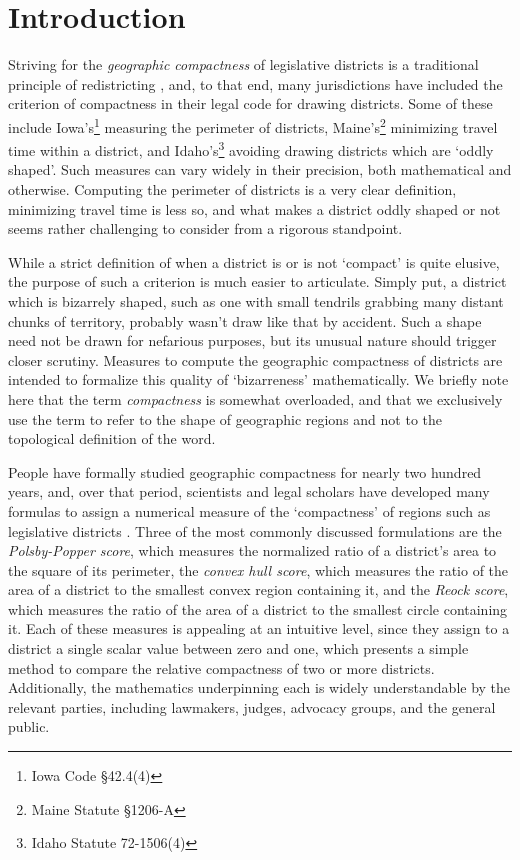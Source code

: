 \section{Introduction}
Striving for the \textit{geographic compactness} of legislative
districts is a traditional principle of redistricting \cite{altman_1998}, and, to that
end, many jurisdictions have included the criterion of compactness in
their legal code for drawing districts.  Some of these include Iowa's\footnote{Iowa Code \S42.4(4)} measuring the perimeter of districts, Maine's\footnote{Maine Statute \S1206-A} minimizing travel time within a district, and Idaho's\footnote{Idaho Statute 72-1506(4)} avoiding 
drawing districts which are `oddly shaped'.  Such measures can vary widely in their 
precision, both mathematical and otherwise.  Computing the perimeter of districts is a very clear definition, minimizing travel time is less so, and what makes a district oddly shaped or not seems rather challenging to consider from a rigorous standpoint. 

While a strict definition of when a district is or is not `compact' is quite elusive, the purpose of such a criterion is much easier to articulate.  Simply put, a district which is bizarrely shaped, such as one with small tendrils grabbing many distant chunks of territory,
probably wasn't draw like that by accident. Such a shape need not be drawn for nefarious
purposes, but its unusual nature should trigger closer scrutiny.  Measures to compute the
geographic compactness of districts are intended to formalize this quality of `bizarreness'
mathematically.  We briefly note here that the term \textit{compactness} is somewhat 
overloaded, and that we exclusively use the term to refer to the shape of geographic 
regions and not to the topological definition of the word.


People have formally studied geographic compactness for nearly two hundred years, and, over that period, scientists and legal scholars have developed many formulas to assign a numerical measure of the `compactness' of regions such as legislative districts \cite{young_compactness}.
 Three of the most commonly discussed formulations are the \textit{Polsby-Popper score}, which
measures the normalized ratio of a district's area to the square of its
perimeter, the \textit{convex hull score}, which measures the ratio
of the area of a district to the smallest convex region containing it,
and the \textit{Reock score}, which measures the ratio of the area of
a district to the smallest circle containing it.  Each of these
measures is appealing at an intuitive level, since they assign to
a district a single scalar value between zero and one, which presents a simple 
method to compare the relative compactness of two or more districts. 
Additionally, the
mathematics underpinning each is widely understandable by the relevant
parties, including lawmakers, judges, advocacy groups, and the general
public.  

